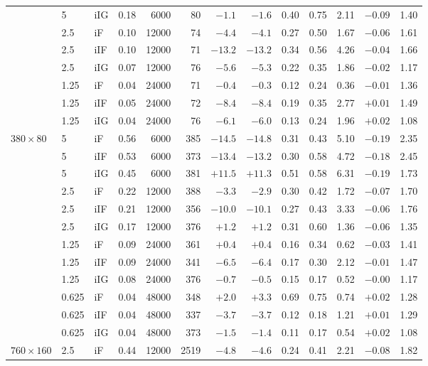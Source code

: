 \begin{tabular}{@{}lllrrrrrrrrrr@{}}
 & 5 & iIG & 0.18 & 6000 & 80 & $-1.1$ & $-1.6$ & 0.40 & 0.75 & 2.11 & $-0.09$ & 1.40 \\
 & 2.5 & iF & 0.10 & 12000 & 74 & $-4.4$ & $-4.1$ & 0.27 & 0.50 & 1.67 & $-0.06$ & 1.61 \\
 & 2.5 & iIF & 0.10 & 12000 & 71 & $-13.2$ & $-13.2$ & 0.34 & 0.56 & 4.26 & $-0.04$ & 1.66 \\
 & 2.5 & iIG & 0.07 & 12000 & 76 & $-5.6$ & $-5.3$ & 0.22 & 0.35 & 1.86 & $-0.02$ & 1.17 \\
 & 1.25 & iF & 0.04 & 24000 & 71 & $-0.4$ & $-0.3$ & 0.12 & 0.24 & 0.36 & $-0.01$ & 1.36 \\
 & 1.25 & iIF & 0.05 & 24000 & 72 & $-8.4$ & $-8.4$ & 0.19 & 0.35 & 2.77 & $+0.01$ & 1.49 \\
 & 1.25 & iIG & 0.04 & 24000 & 76 & $-6.1$ & $-6.0$ & 0.13 & 0.24 & 1.96 & $+0.02$ & 1.08 \\
\midrule
$380\times80$ & 5 & iF & 0.56 & 6000 & 385 & $-14.5$ & $-14.8$ & 0.31 & 0.43 & 5.10 & $-0.19$ & 2.35 \\
 & 5 & iIF & 0.53 & 6000 & 373 & $-13.4$ & $-13.2$ & 0.30 & 0.58 & 4.72 & $-0.18$ & 2.45 \\
 & 5 & iIG & 0.45 & 6000 & 381 & $+11.5$ & $+11.3$ & 0.51 & 0.58 & 6.31 & $-0.19$ & 1.73 \\
 & 2.5 & iF & 0.22 & 12000 & 388 & $-3.3$ & $-2.9$ & 0.30 & 0.42 & 1.72 & $-0.07$ & 1.70 \\
 & 2.5 & iIF & 0.21 & 12000 & 356 & $-10.0$ & $-10.1$ & 0.27 & 0.43 & 3.33 & $-0.06$ & 1.76 \\
 & 2.5 & iIG & 0.17 & 12000 & 376 & $+1.2$ & $+1.2$ & 0.31 & 0.60 & 1.36 & $-0.06$ & 1.35 \\
 & 1.25 & iF & 0.09 & 24000 & 361 & $+0.4$ & $+0.4$ & 0.16 & 0.34 & 0.62 & $-0.03$ & 1.41 \\
 & 1.25 & iIF & 0.09 & 24000 & 341 & $-6.5$ & $-6.4$ & 0.17 & 0.30 & 2.12 & $-0.01$ & 1.47 \\
 & 1.25 & iIG & 0.08 & 24000 & 376 & $-0.7$ & $-0.5$ & 0.15 & 0.17 & 0.52 & $-0.00$ & 1.17 \\
 & 0.625 & iF & 0.04 & 48000 & 348 & $+2.0$ & $+3.3$ & 0.69 & 0.75 & 0.74 & $+0.02$ & 1.28 \\
 & 0.625 & iIF & 0.04 & 48000 & 337 & $-3.7$ & $-3.7$ & 0.12 & 0.18 & 1.21 & $+0.01$ & 1.29 \\
 & 0.625 & iIG & 0.04 & 48000 & 373 & $-1.5$ & $-1.4$ & 0.11 & 0.17 & 0.54 & $+0.02$ & 1.08 \\
\midrule
$760\times160$ & 2.5 & iF & 0.44 & 12000 & 2519 & $-4.8$ & $-4.6$ & 0.24 & 0.41 & 2.21 & $-0.08$ & 1.82 \\

\end{tabular}
